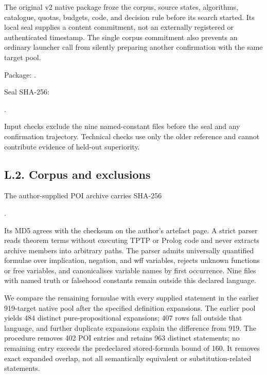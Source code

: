 \documentclass[pdflatex,sn-basic,Numbered]{sn-jnl}
\begin{document}
The original v2 native package froze the corpus, source states, algorithms, catalogue, quotas, budgets, code, and decision rule before its search started. Its local seal supplies a content commitment, not an externally registered or authenticated timestamp. The single corpus commitment also prevents an ordinary launcher call from silently preparing another confirmation with the same target pool.

Package: .

Seal SHA-256:

.

Input checks exclude the nine named-constant files before the seal and any confirmation trajectory. Technical checks use only the older reference and cannot contribute evidence of held-out superiority.

\subsection*{L.2. Corpus and exclusions}\label{l.2.-corpus-and-exclusions}

The author-supplied POI archive carries SHA-256

.

Its MD5 agrees with the checksum on the author's artefact page. A strict parser reads theorem terms without executing TPTP or Prolog code and never extracts archive members into arbitrary paths. The parser admits universally quantified formulae over implication, negation, and wff variables, rejects unknown functions or free variables, and canonicalises variable names by first occurrence. Nine files with named truth or falsehood constants remain outside this declared language.

We compare the remaining formulae with every supplied statement in the earlier 919-target native pool after the specified definition expansions. The earlier pool yields 484 distinct pure-propositional expansions; 407 rows fall outside that language, and further duplicate expansions explain the difference from 919. The procedure removes 402 POI entries and retains 963 distinct statements; no remaining entry exceeds the predeclared stored-formula bound of 160. It removes exact expanded overlap, not all semantically equivalent or substitution-related statements.
\end{document}

